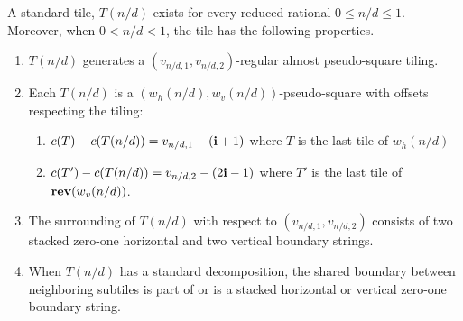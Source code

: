 \documentclass[12pt]{amsart}
\begin{document}
\begin{lemma} \label{lemma:standard_tile_properties}
	A standard tile, $T(n/d)$ exists for every reduced rational $0 \leq n/d \leq 1$. Moreover, 
	when $0 < n/d < 1$, the tile has the following properties. 
	\begin{enumerate}[label=(\alph*)]
		\item $T(n/d)$ generates a $(v_{n/d,1}, v_{n/d,2})$-regular almost pseudo-square tiling. 
		\item Each $T(n/d)$ is a $(w_{h}(n/d), w_v(n/d))$-pseudo-square with offsets respecting the tiling: 
			\begin{enumerate}[label=(\roman*)]
				\item $c(T) - c(T(n/d)) = v_{n/d,1} - (\mathbf{i}+1)$ where $T$ is the last tile of $w_{h}(n/d)$
				\item $c(T') - c(T(n/d)) = v_{n/d,2} - (2 \mathbf{i}-1)$ where $T'$ is the last tile of $\mathop{\bf rev}(w_{v}(n/d))$.
			\end{enumerate}
		\item The surrounding of $T(n/d)$ with respect to $(v_{n/d,1}, v_{n/d,2})$ consists of two stacked zero-one horizontal and two vertical boundary strings.
		\item When $T(n/d)$ has a standard decomposition, the shared boundary between neighboring subtiles is part of or is a stacked horizontal or vertical zero-one boundary string. 
	\end{enumerate}
\end{lemma}
\end{document}
